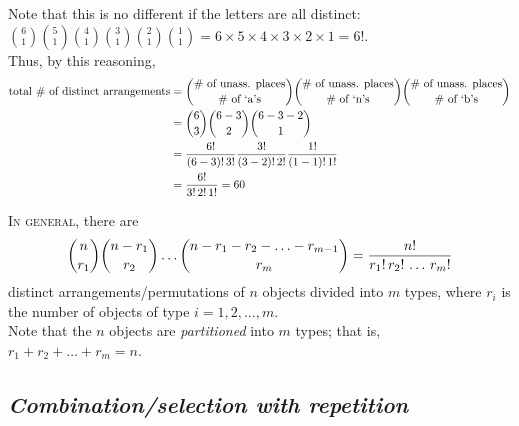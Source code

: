 \documentclass{article}
\begin{document}
Note that this is no different if the letters are all distinct: $\binom{6}{1}\binom{5}{1}\binom{4}{1}\binom{3}{1}\binom{2}{1}\binom{1}{1}=6\times 5\times 4\times 3\times 2\times 1=6!$.\\[1ex]
Thus, by this reasoning,
\begin{align*}
\text{total \# of distinct arrangements}& =\dbinom{\text{\# of unass. places}}{\text{\# of `a's}}\dbinom{\text{\# of unass. places}}{{\text{\# of `n's}}}\dbinom{\text{\# of unass. places}}{{\text{\# of `b's}}}\\
& =\dbinom{6}{3}\dbinom{6-3}{2}\dbinom{6-3-2}{1}\\
& =\dfrac{6!}{(6-3)!\,3!}\dfrac{3!}{(3-2)!\,2!}\dfrac{1!}{(1-1)!\,1!}\\
& =\dfrac{6!}{3!\,2!\,1!}=60
\end{align*}

\textsc{In general,} there are
\begin{equation*}
\dbinom{n}{r_1}\dbinom{n-r_1}{r_2}\ldots\dbinom{n-r_1-r_2-\ldots-r_{m-1}}{r_m}=\dfrac{n!}{r_1!\,r_2!\,\ldots\,r_m!}
\end{equation*}
distinct arrangements/permutations of $n$ objects divided into $m$ types, where $r_i$ is the number of objects of type $i=1,2,\ldots,m$.\\[1ex]
Note that the $n$ objects are \textit{partitioned} into $m$ types; that is, $r_1+r_2+\ldots+r_m=n$.

\subsection{\em Combination/selection with repetition}
\end{document}
